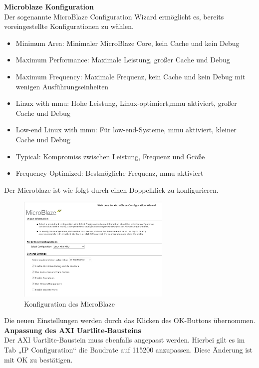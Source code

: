\newpage

\textbf{Microblaze Konfiguration}\\

Der sogenannte MicroBlaze Configuration Wizard ermöglicht es, bereits voreingestellte Konfigurationen zu wählen.

\begin{itemize}
  \item Minimum Area: Minimaler MicroBlaze Core, kein Cache und kein Debug
  \item Maximum Performance: Maximale Leistung, großer Cache und Debug
  \item Maximum Frequency: Maximale Frequenz, kein Cache und kein Debug mit wenigen Ausführungseinheiten
  \item Linux with \ac{mmu}: Hohe Leistung, Linux-optimiert,\ac{mmu} aktiviert, großer Cache und Debug
  \item Low-end Linux with \ac{mmu}: Für low-end-Systeme, \ac{mmu} aktiviert, kleiner Cache und Debug
  \item Typical: Kompromiss zwischen Leistung, Frequenz und Größe
  \item Frequency Optimized: Bestmögliche Frequenz, \ac{mmu} aktiviert
\end{itemize}

  Der Microblaze ist wie folgt durch einen Doppelklick zu konfigurieren.

\begin{figure}[H]
\centering
\includegraphics[width=0.65\textwidth]{Hauptteil/microkonf.png}
\caption{Konfiguration des MicroBlaze}\label{fig:mbschritt9}
\end{figure}
Die neuen Einstellungen werden durch das Klicken des OK-Buttons übernommen.\\

\textbf{Anpassung des AXI Uartlite-Bausteins}\\

Der AXI Uartlite-Baustein muss ebenfalls angepasst werden. Hierbei gilt es im Tab „IP Configuration“ die Baudrate auf 115200 anzupassen.
Diese Änderung ist mit OK zu bestätigen.\\

